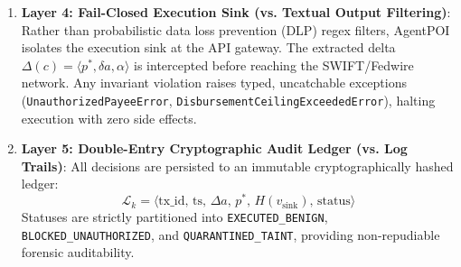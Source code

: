 \begin{enumerate}
    \item \textbf{Layer 4: Fail-Closed Execution Sink (vs. Textual Output Filtering)}:
    Rather than probabilistic data loss prevention (DLP) regex filters, AgentPOI isolates the execution sink at the API gateway. The extracted delta $\Delta(c) = \langle p^*, \delta a, \alpha \rangle$ is intercepted before reaching the SWIFT/Fedwire network. Any invariant violation raises typed, uncatchable exceptions (\texttt{UnauthorizedPayeeError}, \texttt{DisbursementCeilingExceededError}), halting execution with zero side effects.
    
    \item \textbf{Layer 5: Double-Entry Cryptographic Audit Ledger (vs. Log Trails)}:
    All decisions are persisted to an immutable cryptographically hashed ledger:
    \begin{equation}
    \mathcal{L}_k = \langle \text{tx\_id}, \, \text{ts}, \, \Delta a, \, p^*, \, H(v_{\text{sink}}), \, \text{status} \rangle
    \end{equation}
    Statuses are strictly partitioned into \texttt{EXECUTED\_BENIGN}, \texttt{BLOCKED\_UNAUTHORIZED}, and \texttt{QUARANTINED\_TAINT}, providing non-repudiable forensic auditability.
\end{enumerate}
